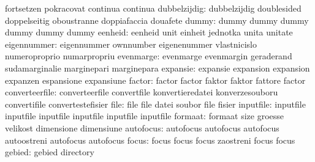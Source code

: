                            fortsetzen                pokracovat
                           continua                  continua
             dubbelzijdig: dubbelzijdig              doublesided
                           doppelseitig              oboustranne
                           doppiafaccia              douafete
                    dummy: dummy                     dummy
                           dummy                     dummy
                           dummy                     dummy
                  eenheid: eenheid                   unit
                           einheit                   jednotka
                           unita                     unitate
              eigennummer: eigennummer               ownnumber
                           eigenenummer              vlastnicislo
                           numeroproprio             numarpropriu
                evenmarge: evenmarge                 evenmargin
                           geraderand                sudamarginalie
                           marginepari               marginepara
                 expansie: expansie                  expansion
                           expansion                 expanzen
                           espansione                expansiune
                   factor: factor                    factor
                           faktor                    faktor
                           fattore                   factor
           converteerfile: converteerfile            convertfile
                           konvertieredatei          konverzesouboru
                           convertifile              convertestefisier
                     file: file                      file
                           datei                     soubor
                           file                      fisier
                inputfile: inputfile                 inputfile
                           inputfile                 inputfile
                           inputfile                 inputfile %
                  formaat: formaat                   size
                           groesse                   velikost
                           dimensione                dimensiune
                autofocus: autofocus                 autofocus
                           autofocus                 autoostreni
                           autofocus                 autofocus
                    focus: focus                     focus
                           focus                     zaostreni
                           focus                     focus %
                   gebied: gebied                    directory
